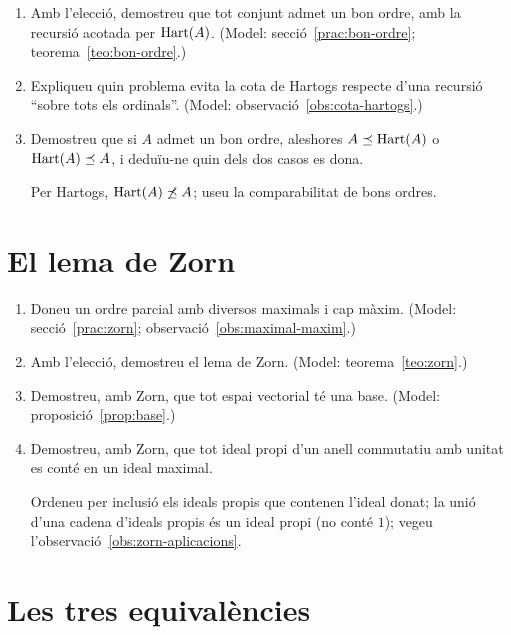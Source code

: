 \begin{enumerate}[resume]
  \item Amb l'elecció, demostreu que tot conjunt admet un bon ordre, amb la recursió acotada per \(\operatorname{Hart}(A)\). (Model: secció~\ref{prac:bon-ordre}; teorema~\ref{teo:bon-ordre}.)

  \item Expliqueu quin problema evita la cota de Hartogs respecte d'una recursió \enquote{sobre tots els ordinals}. (Model: observació~\ref{obs:cota-hartogs}.)

  \item Demostreu que si \(A\) admet un bon ordre, aleshores \(A\preceq\operatorname{Hart}(A)\) o \(\operatorname{Hart}(A)\preceq A\), i deduïu-ne quin dels dos casos es dona. \begin{indicacio}Per Hartogs, \(\operatorname{Hart}(A)\not\preceq A\); useu la comparabilitat de bons ordres.\end{indicacio}
\end{enumerate}

\section{El lema de Zorn}

\begin{enumerate}[resume]
  \item Doneu un ordre parcial amb diversos maximals i cap màxim. (Model: secció~\ref{prac:zorn}; observació~\ref{obs:maximal-maxim}.)

  \item Amb l'elecció, demostreu el lema de Zorn. (Model: teorema~\ref{teo:zorn}.)

  \item Demostreu, amb Zorn, que tot espai vectorial té una base. (Model: proposició~\ref{prop:base}.)

  \item Demostreu, amb Zorn, que tot ideal propi d'un anell commutatiu amb unitat es conté en un ideal maximal. \begin{indicacio}Ordeneu per inclusió els ideals propis que contenen l'ideal donat; la unió d'una cadena d'ideals propis és un ideal propi (no conté \(1\)); vegeu l'observació~\ref{obs:zorn-aplicacions}.\end{indicacio}
\end{enumerate}

\section{Les tres equivalències}

